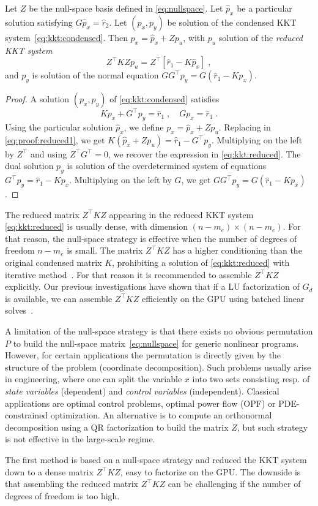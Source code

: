 \begin{proposition}
  Let $Z$ be the null-space basis defined in \eqref{eq:nullspace}.
  Let $\hat{p}_x$ be a particular solution satisfying $G \hat{p}_x = \hat{r}_2$.
  Let $(p_x, p_y)$ be
  solution of the condensed KKT system~\eqref{eq:kkt:condensed}.
  Then $p_x= \hat{p}_x + Z p_u$, with $p_u$ solution of the \emph{reduced KKT system}
  \begin{equation}
    \label{eq:kkt:reduced}
    \tag{$K_0$}
    Z^\top K Z p_u =
    Z^\top [\hat{r}_1 - K \hat{p}_x ] \; ,
  \end{equation}
  and $p_y$ is solution of the normal equation $G G^\top p_y = G (\hat{r}_1 - K p_x)$.
\end{proposition}
\begin{proof}
  A solution $(p_x, p_y)$ of \eqref{eq:kkt:condensed} satisfies
  \begin{equation}
    \label{eq:proof:reduced1}
    K p_x + G^\top p_y = \hat{r}_1 \; , \quad
    G p_x = \hat{r}_1  \; .
  \end{equation}
  Using the particular solution $\hat{p}_x$, we define
  $p_x = \hat{p}_x + Z p_u$. Replacing in \eqref{eq:proof:reduced1},
  we get $K (\hat{p}_x + Z p_u) = \hat{r}_1 - G^\top p_y$.
  Multiplying on the left by $Z^\top$ and using $Z^\top G^\top = 0$,
  we recover the expression in \eqref{eq:kkt:reduced}.
  The dual solution $p_y$ is solution of the overdetermined
  system of equations $G^\top p_y = \hat{r}_1 - K p_x$.
  Multiplying on the left by $G$, we get $G G^\top p_y =
  G (\hat{r}_1 - K p_x)$.
\end{proof}

The reduced matrix $Z^\top K Z$ appearing in the reduced KKT system
\eqref{eq:kkt:reduced} is usually dense, with dimension $(n-m_e) \times
(n - m_e)$. For that reason, the null-space strategy is effective
when the number of degrees of freedom $n - m_e$ is small.
The matrix $Z^\top K Z$ has a higher conditioning than the original
condensed matrix $K$, prohibiting a solution of \eqref{eq:kkt:reduced}
with iterative method~\cite{gould2001solution}. For that reason
it is recommended to assemble $Z^\top K Z$ explicitly. Our previous
investigations have shown that if a LU factorization of $G_d$ is
available, we can assemble $Z^\top K Z$ efficiently on the GPU
using batched linear solves~\cite{pacaud2022condensed}.

A limitation of the null-space strategy is that
there exists no obvious permutation $P$ to build the null-space
matrix~\eqref{eq:nullspace} for generic nonlinear programs. However, for certain applications the
permutation is directly given by the structure of the problem
(coordinate decomposition).
Such problems usually arise in engineering, where one can split
the variable $x$ into two sets consisting resp. of \emph{state variables} (dependent)
and \emph{control variables} (independent). Classical applications
are optimal control problems, optimal power flow (OPF) or PDE-constrained optimization.
An alternative is to compute an orthonormal decomposition using a QR factorization
to build the matrix $Z$, but such strategy is not effective in the
large-scale regime.

The first method is based on a null-space
strategy and reduced the KKT system down to a dense matrix $Z^\top K Z$, easy
to factorize on the GPU. The downside is that assembling the reduced
matrix $Z^\top K Z$ can be challenging if the number of degrees of freedom
is too high.
